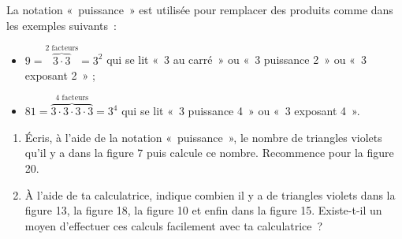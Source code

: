 \begin{activite}
\begin{partie}
La notation « puissance » est utilisée pour remplacer des produits comme dans les exemples suivants :
\begin{itemize}
 \item $9 = \stackrel{2 \text{ facteurs}}{\overbrace{3 \cdot 3}} = 3^2$ qui se lit « 3 au carré » ou « 3 puissance 2 » ou « 3 exposant 2 » ;
 \item $81 = \stackrel{4 \text{ facteurs}}{\overbrace{3 \cdot 3 \cdot 3 \cdot 3}} = 3^4$ qui se lit « 3 puissance 4 » ou « 3 exposant 4 ».
 \end{itemize}
\begin{enumerate}
 \item Écris, à l'aide de la notation « puissance », le nombre de triangles violets qu'il y a dans la figure 7 puis calcule ce nombre. Recommence pour la figure 20.
 \item À l'aide de ta calculatrice, indique combien il y a de triangles violets dans la figure 13, la figure 18, la figure 10 et enfin dans la figure 15. Existe-t-il un moyen d'effectuer ces calculs facilement avec ta calculatrice ?
 \end{enumerate}
\end{partie}

\end{activite}


